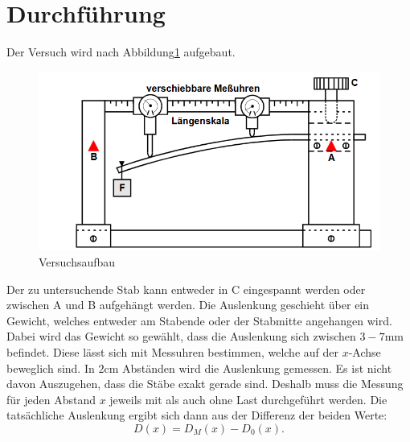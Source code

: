 \section{Durchführung}
Der Versuch wird nach Abbildung\ref{fig:aufbau} aufgebaut.
\begin{figure}
    \centering
    \includegraphics[width=\textwidth]{content/aufbau.png}
    \caption{Versuchsaufbau}
    \label{fig:aufbau}
\end{figure}
Der zu untersuchende Stab kann entweder in C eingespannt werden oder zwischen A und B aufgehängt werden.
Die Auslenkung geschieht über ein Gewicht, welches entweder am Stabende oder der Stabmitte angehangen wird.
Dabei wird das Gewicht so gewählt, dass die Auslenkung sich zwischen $3-7\si{\milli\meter}$ befindet.
Diese lässt sich mit Messuhren bestimmen, welche auf der $x$-Achse beweglich sind.
In $2\si{\centi\meter}$ Abständen wird die Auslenkung gemessen.
Es ist nicht davon Auszugehen, dass die Stäbe exakt gerade sind.
Deshalb muss die Messung für jeden Abstand $x$ jeweils mit als auch ohne Last durchgeführt werden.
Die tatsächliche Auslenkung ergibt sich dann aus der Differenz der beiden Werte:
\begin{equation}
  D(x)=D_M(x) - D_0(x) .
\end{equation}

